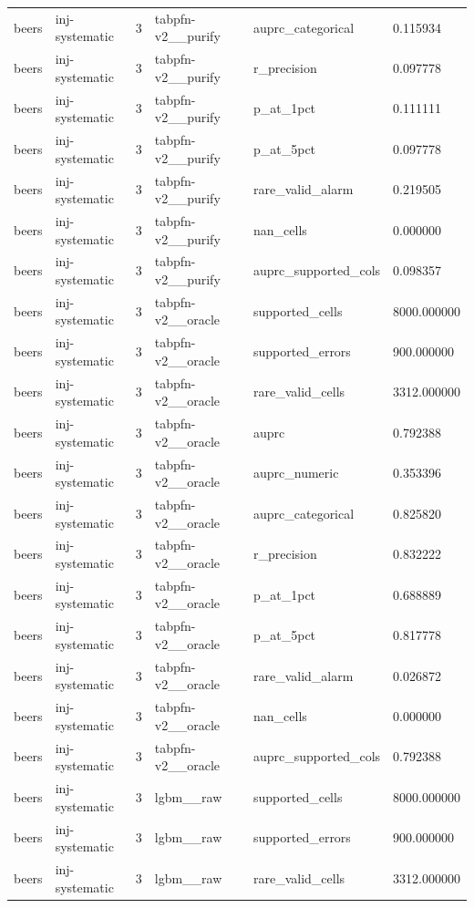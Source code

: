 \begin{tabular}{llllll}
beers & inj-systematic & 3 & tabpfn-v2\_\_purify & auprc\_categorical & 0.115934 \\
beers & inj-systematic & 3 & tabpfn-v2\_\_purify & r\_precision & 0.097778 \\
beers & inj-systematic & 3 & tabpfn-v2\_\_purify & p\_at\_1pct & 0.111111 \\
beers & inj-systematic & 3 & tabpfn-v2\_\_purify & p\_at\_5pct & 0.097778 \\
beers & inj-systematic & 3 & tabpfn-v2\_\_purify & rare\_valid\_alarm & 0.219505 \\
beers & inj-systematic & 3 & tabpfn-v2\_\_purify & nan\_cells & 0.000000 \\
beers & inj-systematic & 3 & tabpfn-v2\_\_purify & auprc\_supported\_cols & 0.098357 \\
beers & inj-systematic & 3 & tabpfn-v2\_\_oracle & supported\_cells & 8000.000000 \\
beers & inj-systematic & 3 & tabpfn-v2\_\_oracle & supported\_errors & 900.000000 \\
beers & inj-systematic & 3 & tabpfn-v2\_\_oracle & rare\_valid\_cells & 3312.000000 \\
beers & inj-systematic & 3 & tabpfn-v2\_\_oracle & auprc & 0.792388 \\
beers & inj-systematic & 3 & tabpfn-v2\_\_oracle & auprc\_numeric & 0.353396 \\
beers & inj-systematic & 3 & tabpfn-v2\_\_oracle & auprc\_categorical & 0.825820 \\
beers & inj-systematic & 3 & tabpfn-v2\_\_oracle & r\_precision & 0.832222 \\
beers & inj-systematic & 3 & tabpfn-v2\_\_oracle & p\_at\_1pct & 0.688889 \\
beers & inj-systematic & 3 & tabpfn-v2\_\_oracle & p\_at\_5pct & 0.817778 \\
beers & inj-systematic & 3 & tabpfn-v2\_\_oracle & rare\_valid\_alarm & 0.026872 \\
beers & inj-systematic & 3 & tabpfn-v2\_\_oracle & nan\_cells & 0.000000 \\
beers & inj-systematic & 3 & tabpfn-v2\_\_oracle & auprc\_supported\_cols & 0.792388 \\
beers & inj-systematic & 3 & lgbm\_\_raw & supported\_cells & 8000.000000 \\
beers & inj-systematic & 3 & lgbm\_\_raw & supported\_errors & 900.000000 \\
beers & inj-systematic & 3 & lgbm\_\_raw & rare\_valid\_cells & 3312.000000 \\

\end{tabular}
